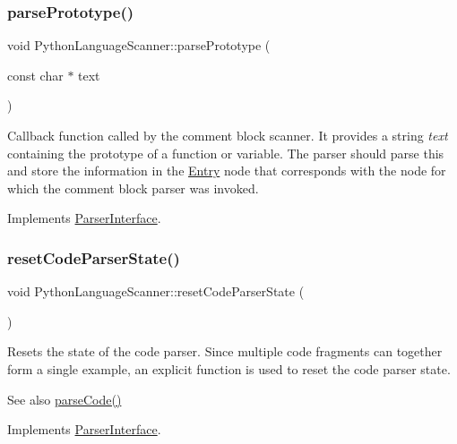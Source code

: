 \subsubsection{\texorpdfstring{parsePrototype()}{parsePrototype()}}
{\footnotesize\ttfamily void Python\+Language\+Scanner\+::parse\+Prototype (\begin{DoxyParamCaption}\item[{const char $\ast$}]{text }\end{DoxyParamCaption})\hspace{0.3cm}{\ttfamily [virtual]}}

Callback function called by the comment block scanner. It provides a string {\itshape text} containing the prototype of a function or variable. The parser should parse this and store the information in the \mbox{\hyperlink{class_entry}{Entry}} node that corresponds with the node for which the comment block parser was invoked. 

Implements \mbox{\hyperlink{class_parser_interface_a5ebf0f524a296845befa22c85a4cc80b}{Parser\+Interface}}.

\mbox{\label{class_python_language_scanner_a7d8f587a1753e7d04dee2b5ddbc6c1df}} 
\subsubsection{\texorpdfstring{resetCodeParserState()}{resetCodeParserState()}}
{\footnotesize\ttfamily void Python\+Language\+Scanner\+::reset\+Code\+Parser\+State (\begin{DoxyParamCaption}{ }\end{DoxyParamCaption})\hspace{0.3cm}{\ttfamily [virtual]}}

Resets the state of the code parser. Since multiple code fragments can together form a single example, an explicit function is used to reset the code parser state. \begin{DoxySeeAlso}{See also}
\mbox{\hyperlink{class_python_language_scanner_a0920a8f0a1fc295f0e9c240aee99012c}{parse\+Code()}} 
\end{DoxySeeAlso}


Implements \mbox{\hyperlink{class_parser_interface_aee4fccd1865a4e8a6b9f2896811104ca}{Parser\+Interface}}.

